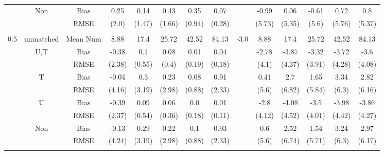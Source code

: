 \begin{tabular}{@{\extracolsep{5pt}}lc|cccccc|lccccc}
 & Non & Bias & 0.25 & 0.14 & 0.43 & 0.35 & 0.07 &  & -0.99 & 0.06 & -0.61 & 0.72 & 0.8 \\
 &  & RMSE & (2.0) & (1.47) & (1.66) & (0.94) & (0.28) &  & (5.73) & (5.35) & (5.6) & (5.76) & (5.37) \\
 &  &  &  &  &  &  &  &  &  &  &  &  &  \\
0.5 & unmatched & Mean Num & 8.88 & 17.4 & 25.72 & 42.52 & 84.13 & -3.0 & 8.88 & 17.4 & 25.72 & 42.52 & 84.13 \\
 & U,T & Bias & -0.38 & 0.1 & 0.08 & 0.01 & 0.04 &  & -2.78 & -3.87 & -3.32 & -3.72 & -3.6 \\
 &  & RMSE & (2.38) & (0.55) & (0.4) & (0.19) & (0.18) &  & (4.1) & (4.37) & (3.91) & (4.28) & (4.08) \\
 & T & Bias & -0.04 & 0.3 & 0.23 & 0.08 & 0.91 &  & 0.41 & 2.7 & 1.65 & 3.34 & 2.82 \\
 &  & RMSE & (4.16) & (3.19) & (2.98) & (0.88) & (2.33) &  & (5.6) & (6.82) & (5.84) & (6.3) & (6.16) \\
 & U & Bias & -0.39 & 0.09 & 0.06 & 0.0 & 0.01 &  & -2.8 & -4.08 & -3.5 & -3.98 & -3.86 \\
 &  & RMSE & (2.37) & (0.54) & (0.36) & (0.18) & (0.11) &  & (4.12) & (4.52) & (4.01) & (4.42) & (4.27) \\
 & Non & Bias & -0.13 & 0.29 & 0.22 & 0.1 & 0.93 &  & 0.6 & 2.52 & 1.54 & 3.24 & 2.97 \\
 &  & RMSE & (4.24) & (3.19) & (2.98) & (0.88) & (2.33) &  & (5.6) & (6.74) & (5.71) & (6.3) & (6.17) \\
 &  &  &  &  &  &  &  &  &  &  &  &  &  \\
\hline 
\bottomrule 
\end{tabular}
